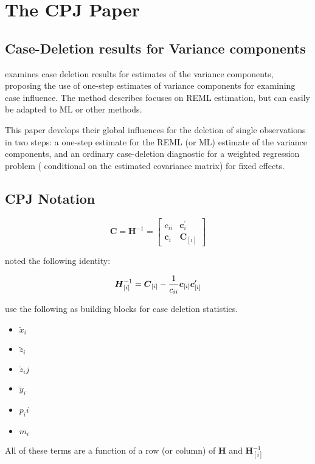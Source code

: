 \documentclass[Chap5amain.tex]{subfiles}
\begin{document}
\newpage
\section{The CPJ Paper}%

\subsection{Case-Deletion results for Variance components}
\citet{CPJ} examines case deletion results for estimates of the variance components, proposing the use of one-step estimates of variance components for examining case influence. The method describes focuses on REML estimation, but can easily be adapted to ML or other methods.

This paper develops their global influences for the deletion of single observations in two steps: a one-step estimate for the REML (or ML) estimate of the variance components, and an ordinary case-deletion diagnostic for a weighted regression problem ( conditional on the estimated covariance matrix) for fixed effects.


\subsection{CPJ Notation} %

\[ \boldsymbol{C} = \boldsymbol{H}^{-1} = \left[
\begin{array}{cc}
c_{ii} & \boldsymbol{c}_{i}^{\prime}\\
\boldsymbol{c}_{i} &  \boldsymbol{C}_{[i]}
\end{array} \right]
\]

\citet{CPJ} noted the following identity:

\[ \boldsymbol{H}_{[i]}^{-1}  = \boldsymbol{C}_{[i]} - {1 \over c_{ii}}\boldsymbol{c}_{[i]}\boldsymbol{c}_{[i]}^{\prime} \]


\citet{CPJ} use the following as building blocks for case deletion statistics.
\begin{itemize}
\item $\breve{x}_i$
\item $\breve{z}_i$
\item $\breve{z}_ij$
\item $\breve{y}_i$
\item $p_ii$
\item $m_i$
\end{itemize}
All of these terms are a function of a row (or column) of $\boldsymbol{H}$ and $\boldsymbol{H}_{[i]}^{-1}$
\end{document}
